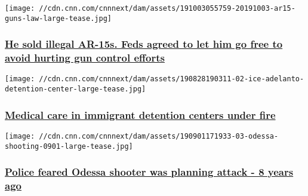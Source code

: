 \href{/2019/10/11/us/ar-15-guns-law-atf-invs/index.html}{}

\texttt{[image: //cdn.cnn.com/cnnnext/dam/assets/191003055759-20191003-ar15-guns-law-large-tease.jpg]}

\hypertarget{he-sold-illegal-ar-15s-feds-agreed-to-let-him-go-free-to-avoid-hurting-gun-control-efforts}{%
\subsubsection{\texorpdfstring{\href{/2019/10/11/us/ar-15-guns-law-atf-invs/index.html}{He
sold illegal AR-15s. Feds agreed to let him go free to avoid hurting gun
control
efforts}}{He sold illegal AR-15s. Feds agreed to let him go free to avoid hurting gun control efforts}}\label{he-sold-illegal-ar-15s-feds-agreed-to-let-him-go-free-to-avoid-hurting-gun-control-efforts}}

\href{/2019/10/04/us/immigrant-medical-care-wellpath-invs/index.html}{}

\texttt{[image: //cdn.cnn.com/cnnnext/dam/assets/190828190311-02-ice-adelanto-detention-center-large-tease.jpg]}

\hypertarget{medical-care-in-immigrant-detention-centers-under-fire}{%
\subsubsection{\texorpdfstring{\href{/2019/10/04/us/immigrant-medical-care-wellpath-invs/index.html}{Medical
care in immigrant detention centers under
fire}}{Medical care in immigrant detention centers under fire}}\label{medical-care-in-immigrant-detention-centers-under-fire}}

\href{/2019/09/29/us/seth-ator-previous-police-encounter-invs/index.html}{}

\texttt{[image: //cdn.cnn.com/cnnnext/dam/assets/190901171933-03-odessa-shooting-0901-large-tease.jpg]}

\hypertarget{police-feared-odessa-shooter-was-planning-attack---8-years-ago}{%
\subsubsection{\texorpdfstring{\href{/2019/09/29/us/seth-ator-previous-police-encounter-invs/index.html}{Police
feared Odessa shooter was planning attack - 8 years
ago}}{Police feared Odessa shooter was planning attack - 8 years ago}}\label{police-feared-odessa-shooter-was-planning-attack---8-years-ago}}

\href{/2019/09/26/health/nuedexta-avanir-doj-settlement-invs/index.html}{}

